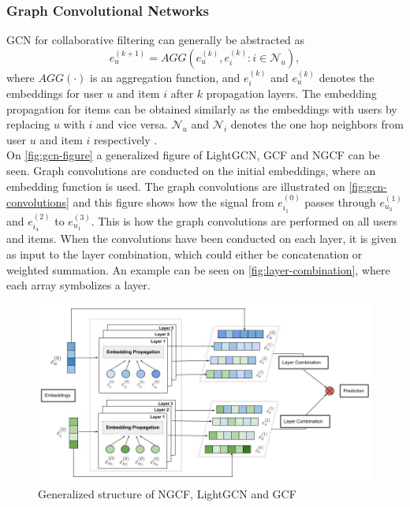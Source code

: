 \subsubsection{Graph Convolutional Networks}
GCN for collaborative filtering can generally be abstracted as \cite{BiTGCF}
\begin{equation}
    e_u^{(k+1)} = AGG(e_u^{(k)},e_i^{(k)} : i \in \mathcal{N}_u),
\end{equation}
where $AGG(\cdot)$ is an aggregation function, and $e_i^{(k)}$ and $e_u^{(k)}$ denotes the embeddings for user $u$ and item $i$ after $k$ propagation layers.
The embedding propagation for items can be obtained similarly as the embeddings with users by replacing $u$ with $i$ and vice versa.
$\mathcal{N}_u$ and $\mathcal{N}_i$ denotes the one hop neighbors from user $u$ and item $i$ respectively \cite{lightgcn,BiTGCF,NGCF_2019}.\\
On \autoref{fig:gcn-figure} a generalized figure of LightGCN, GCF and NGCF can be seen.
Graph convolutions are conducted on the initial embeddings, where an embedding function is used.
The graph convolutions are illustrated on \autoref{fig:gcn-convolutions} and this figure shows how the signal from $e_{i_1}^{(0)}$ passes through $e_{u_3}^{(1)}$ and $e_{i_4}^{(2)}$ to $e_{u_1}^{(3)}$.
This is how the graph convolutions are performed on all users and items.
When the convolutions have been conducted on each layer, it is given as input to the layer combination, which could either be concatenation or weighted summation.
An example can be seen on \autoref{fig:layer-combination}, where each array symbolizes a layer.
\begin{figure}[h!]
    \includegraphics[width=1.1\textwidth]{figures/generalized-gcn-figure.PNG}
    \centering
    \caption{Generalized structure of NGCF, LightGCN and GCF}
    \label{fig:gcn-figure}
\end{figure}
